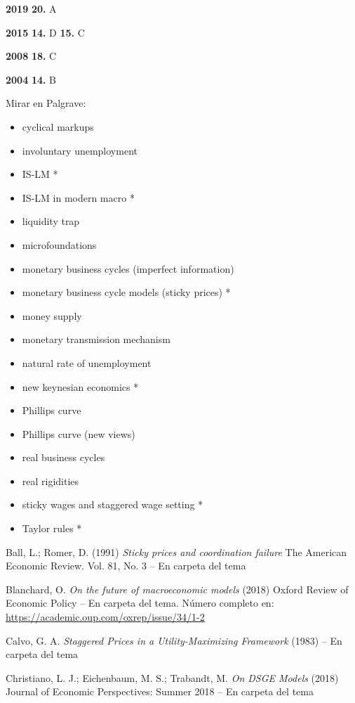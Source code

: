 \documentclass{nuevotema}
\begin{document}
\notas

\textbf{2019} \textbf{20.} A 

\textbf{2015} \textbf{14.} D \textbf{15.} C

\textbf{2008} \textbf{18.} C

\textbf{2004} \textbf{14.} B

\bibliografia

Mirar en Palgrave:
\begin{itemize}
	\item cyclical markups
	\item involuntary unemployment
	\item IS-LM *
	\item IS-LM in modern macro *
	\item liquidity trap
	\item microfoundations
	\item monetary business cycles (imperfect information) 
	\item monetary business cycle models (sticky prices) *
	\item money supply
	\item monetary transmission mechanism
	\item natural rate of unemployment
	\item new keynesian economics *
	\item Phillips curve
	\item Phillips curve (new views)
	\item real business cycles
	\item real rigidities
	\item sticky wages and staggered wage setting *
	\item Taylor rules *
\end{itemize}

Ball, L.; Romer, D. (1991) \textit{Sticky prices and coordination failure} The American Economic Review. Vol. 81, No. 3 -- En carpeta del tema

Blanchard, O. \textit{On the future of macroeconomic models} (2018) Oxford Review of Economic Policy -- En carpeta del tema. Número completo en: \url{https://academic.oup.com/oxrep/issue/34/1-2}

Calvo, G. A. \textit{Staggered Prices in a Utility-Maximizing Framework} (1983) -- En carpeta del tema

Christiano, L. J.; Eichenbaum, M. S.; Trabandt, M. \textit{On DSGE Models} (2018) Journal of Economic Perspectives: Summer 2018 -- En carpeta del tema
\end{document}
